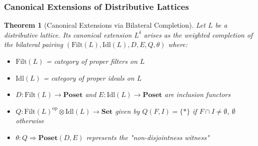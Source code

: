 \documentclass[11pt]{article}
\theoremstyle{plain}
\newtheorem{theorem}{Theorem}[section]
\theoremstyle{definition}
\theoremstyle{remark}
\newcommand{\op}{\mathrm{op}}
\begin{document}
\subsubsection{Canonical Extensions of Distributive Lattices}

\begin{theorem}[Canonical Extensions via Bilateral Completion]\label{thm:canonical-extension-bilateral}
Let $L$ be a distributive lattice. Its canonical extension $L^{\delta}$ arises as the weighted completion of the bilateral pairing $(\mathrm{Filt}(L), \mathrm{Idl}(L), D, E, Q, \theta)$ where:
\begin{itemize}
\item $\mathrm{Filt}(L)$ = category of proper filters on $L$
\item $\mathrm{Idl}(L)$ = category of proper ideals on $L$  
\item $D : \mathrm{Filt}(L) \to \mathbf{Poset}$ and $E : \mathrm{Idl}(L) \to \mathbf{Poset}$ are inclusion functors
\item $Q : \mathrm{Filt}(L)^{\op} \otimes \mathrm{Idl}(L) \to \mathbf{Set}$ given by $Q(F, I) = \{*\}$ if $F \cap I \neq \emptyset$, $\emptyset$ otherwise
\item $\theta : Q \Rightarrow \mathbf{Poset}(D, E)$ represents the "non-disjointness witness"
\end{itemize}
\end{theorem}
\end{document}
